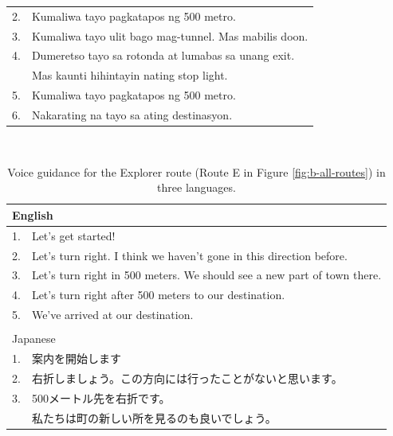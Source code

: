 \begin{table}[h]
\begin{tabular}{ll}
2. & Kumaliwa tayo pagkatapos ng 500 metro.                        \\
3. & Kumaliwa tayo ulit bago mag-tunnel. Mas mabilis doon.         \\
4. & Dumeretso tayo sa rotonda at lumabas sa unang exit.           \\
   & Mas kaunti hihintayin nating stop light.                      \\
5. & Kumaliwa tayo pagkatapos ng 500 metro.                        \\
6. & Nakarating na tayo sa ating destinasyon.                      \\ \hline
\end{tabular}
\end{table}

\begin{table}[h]
\centering
\caption{Voice guidance for the Explorer route (Route E in Figure \ref{fig:b-all-routes}) in three languages.}~\label{tab:b-explorer-pure}
\begin{tabular}{ll}
\hline
\multicolumn{2}{l}{English}                                                  \\ \hline
1. & Let's get started!                                                      \\
2. & Let's turn right. I think we haven't gone in this direction before.     \\
3. & Let's turn right in 500 meters. We should see a new part of town there. \\
4. & Let's turn right after 500 meters to our destination.                   \\
5. & We've arrived at our destination.                                       \\ \hline
   &                                                                         \\ \hline
\multicolumn{2}{l}{Japanese}                                                 \\ \hline
1. & 案内を開始します                                                                \\
2. & 右折しましょう。この方向には行ったことがないと思います。                                            \\
3. & 500メートル先を右折です。                                                          \\
   & 私たちは町の新しい所を見るのも良いでしょう。                                                  \\

\end{tabular}
\end{table}
